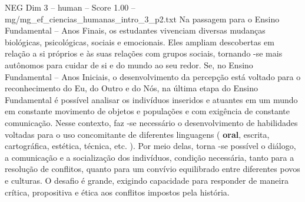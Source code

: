 \begin{textsample}{NEG Dim 3 – human – Score 1.00 – mg/mg\_ef\_ciencias\_humanas\_intro\_3\_p2.txt}  \label{ex:f3_neg_011}
Na passagem para o Ensino Fundamental – Anos Finais, os estudantes vivenciam diversas mudanças biológicas, psicológicas, sociais e emocionais.
Eles ampliam descobertas em relação a si próprios e às suas relações com grupos sociais, tornando -se mais autônomos para cuidar de si e do mundo ao seu redor.
Se, no Ensino Fundamental – Anos Iniciais, o desenvolvimento da percepção está voltado para o reconhecimento do Eu, do Outro e do Nós, na última etapa do Ensino Fundamental é possível analisar os indivíduos inseridos e atuantes em um mundo em constante movimento de objetos e populações e com exigência de constante comunicação.
Nesse contexto, faz -se necessário o desenvolvimento de habilidades voltadas para o uso concomitante de diferentes linguagens ( \textbf{oral}, escrita, cartográfica, estética, técnica, etc. ).
Por meio delas, torna -se possível o diálogo, a comunicação e a socialização dos indivíduos, condição necessária, tanto para a resolução de conflitos, quanto para um convívio equilibrado entre diferentes povos e culturas.
O desafio é grande, exigindo capacidade para responder de maneira crítica, propositiva e ética aos conflitos impostos pela história.

\end{textsample}
